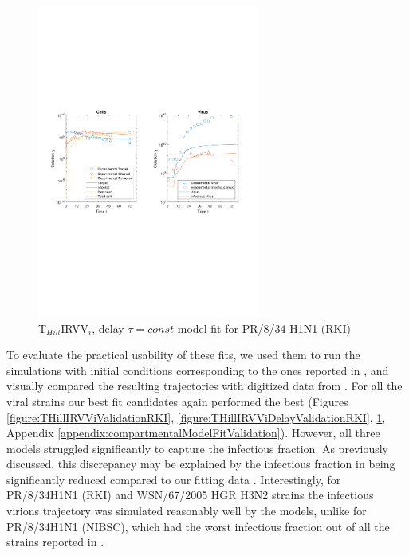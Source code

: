 \begin{figure}[H]
\begin{center}
\includegraphics[width=0.65\textwidth, trim={1cm 9.8cm 1cm 9.5cm}, clip]{D_chapters/6_appendix/4_ValidationRKI/InfectionDepletionModelTHillIRVViDelayFitTauMOI0.025log.pdf}
\caption[T$_{Hill}$IRVV$_i$, delay $\tau = const$ model fit for PR/8/34 H1N1 (RKI)]%
{T$_{Hill}$IRVV$_i$, delay $\tau = const$ model fit for PR/8/34 H1N1 (RKI)}
\label{figure:THillIRVViDelayFitTauValidationRKI}
\end{center}
\end{figure}

To evaluate the practical usability of these fits, we used them to run the simulations with initial conditions corresponding to the ones reported in \cite{schulze2009infection}, and visually compared the resulting trajectories with digitized data from \cite{schulze2009infection}. For all the viral strains our best fit candidates again performed the best (Figures \ref{figure:THillIRVViValidationRKI}, \ref{figure:THillIRVViDelayValidationRKI}, \ref{figure:THillIRVViDelayFitTauValidationRKI}, Appendix \ref{appendix:compartmentalModelFitValidation}). However, all three models struggled significantly to capture the infectious fraction. As previously discussed, this discrepancy may be explained by the infectious fraction in \cite{schulze2009infection} being significantly reduced compared to our fitting data \cite{rudiger2019multiscale}. Interestingly, for PR/8/34H1N1 (RKI) and WSN/67/2005 HGR H3N2 strains the infectious virions trajectory was simulated reasonably well by the models, unlike for PR/8/34H1N1 (NIBSC), which had the worst infectious fraction out of all the strains reported in \cite{schulze2009infection}.

